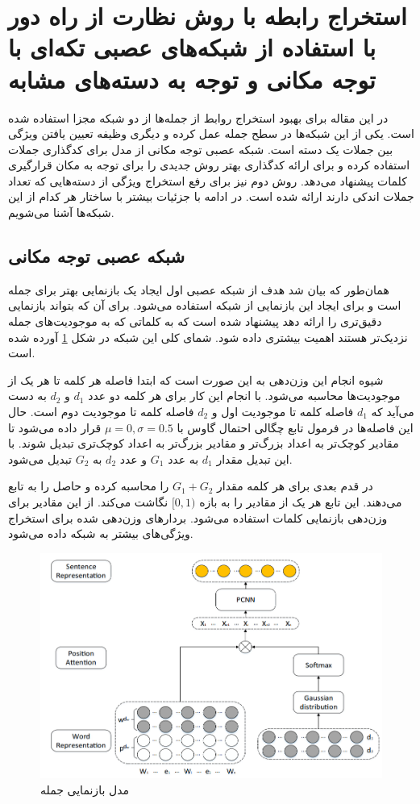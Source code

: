 \section{استخراج رابطه با روش نظارت از راه دور با استفاده از شبکه‌های عصبی تکه‌ای با توجه مکانی و توجه به دسته‌های مشابه\cite{Li2022}}

در این مقاله برای بهبود استخراج روابط از جمله‌ها از دو شبکه مجزا استفاده شده است. یکی از این شبکه‌ها در
سطح جمله عمل کرده و دیگری وظیفه تعیین یافتن ویژگی بین جملات یک دسته است. شبکه عصبی توجه مکانی از
مدل  برای کدگذاری جملات استفاده کرده و برای ارائه کدگذاری بهتر روش جدیدی را برای توجه به
مکان قرارگیری کلمات پیشنهاد می‌دهد. روش دوم نیز برای رفع استخراج ویژگی‌ از دسته‌هایی که تعداد جملات اندکی دارند
ارائه شده است. در ادامه با جزئیات بیشتر با ساختار هر کدام از این شبکه‌ها آشنا می‌شویم.

\subsection{شبکه عصبی توجه مکانی}

همان‌طور که بیان شد هدف از شبکه عصبی اول ایجاد یک بازنمایی بهتر برای جمله است و برای ایجاد این بازنمایی از
شبکه  استفاده می‌شود. برای آن‌ که  بتواند بازنمایی دقیق‌تری را ارائه دهد پیشنهاد شده است
که به کلماتی که به موجودیت‌های جمله نزدیک‌تر هستند اهمیت بیشتری داده شود. شمای کلی این شبکه در شکل
\ref{pos_attension} آورده شده است.

شیوه انجام این وزن‌دهی به این صورت است که ابتدا فاصله هر کلمه تا هر یک از موجودیت‌ها محاسبه می‌شود.
با انجام این کار برای هر کلمه دو عدد $d_1$ و $d_2$ به دست می‌آید که $d_1$ فاصله کلمه تا موجودیت اول و $d_2$
فاصله کلمه تا موجودیت دوم است. حال این فاصله‌ها در فرمول تابع چگالی احتمال گاوس با $\mu=0, \sigma=0.5$ قرار داده
می‌شود تا مقادیر کوچک‌تر به اعداد بزرگ‌تر و مقادیر بزرگ‌تر به اعداد کوچک‌تری تبدیل شوند. با این تبدیل مقدار $d_1$ به عدد $G_1$
و عدد $d_2$ به $G_2$ تبدیل می‌شود.

در قدم بعدی برای هر کلمه مقدار $G_1 + G_2$ را محاسبه کرده و حاصل را به تابع  می‌دهند.
این تابع هر یک از مقادیر را به بازه $[0,1)$ نگاشت می‌کند. از این مقادیر برای وزن‌دهی بازنمایی کلمات
استفاده می‌شود. بردار‌های وزن‌دهی شده برای استخراج ویژگی‌های بیشتر به شبکه  داده می‌شود.

\begin{figure}[h]
    \centering
    \includegraphics[width=0.8\linewidth]{images/pos_attension/pos_attension.png}
    \caption{مدل بازنمایی جمله}
    \label{pos_attension}
\end{figure}

